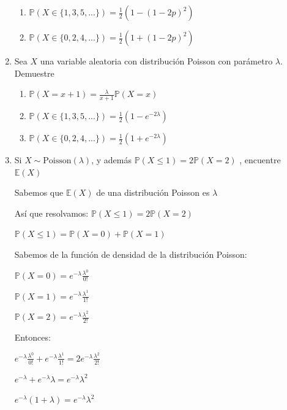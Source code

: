 \documentclass[11pt,a4paper]{report}
\begin{document}
\begin{enumerate}
{\begin{enumerate}
				\item {
					$\mathbb{P}(X \in \{ 1,3,5,...\}) = \frac{1}{2}
					 (1 - (1 - 2p)^2)$
				}

				\item {
					$\mathbb{P}(X \in \{ 0,2,4,...\}) = \frac{1}{2}
					 (1 + (1 - 2p)^2)$
				}
			\end{enumerate}
		}

		\item{
		Sea $X$ una variable aleatoria con distribución Poisson con parámetro
		$\lambda$. Demuestre
			\begin{enumerate}
				\item {
					$\mathbb{P}(X = x + 1) = \frac{\lambda}{x + 1}
					 \mathbb{P}(X = x)$
				}

				\item {
					$\mathbb{P}(X \in \{ 1,3,5,...\}) = \frac{1}{2}
					 (1 - e^{-2\lambda})$
				}

				\item {
					$\mathbb{P}(X \in \{ 0,2,4,...\}) = \frac{1}{2}
					 (1 + e^{-2\lambda})$
				}
			\end{enumerate}
		}

		\item{
			Si $X \sim \text{Poisson}(\lambda)$, y además $\mathbb{P}(X \leq 1)
			= 2\mathbb{P}(X = 2)$ , encuentre $\mathbb{E}(X)$
			
			Sabemos que $\mathbb{E}(X)$ de una distribución Poisson es $\lambda$
			
			Así que resolvamos: $\mathbb{P}(X \leq 1) = 2\mathbb{P}(X = 2)$
			
			$\mathbb{P}(X \leq 1) = \mathbb{P}(X = 0) + \mathbb{P}(X = 1)$
			
			Sabemos de la función de densidad de la distribución Poisson:
			
			$\mathbb{P}(X = 0) = e^{-\lambda} \frac{\lambda^{0}}{0!}$
			
			$\mathbb{P}(X = 1) = e^{-\lambda} \frac{\lambda^{1}}{1!}$

			$\mathbb{P}(X = 2) = e^{-\lambda} \frac{\lambda^{2}}{2!}$
			
			Entonces:
			
			$e^{-\lambda} \frac{\lambda^{0}}{0!} + e^{-\lambda} \frac{\lambda^{1}}{1!} = 2 e^{-\lambda} \frac{\lambda^{2}}{2!}$
			
			$e^{-\lambda}  + e^{-\lambda} \lambda =  e^{-\lambda} \lambda^{2}$
			
			$e^{-\lambda} (1 + \lambda) =  e^{-\lambda} \lambda^{2}$
			
}
\end{enumerate}
\end{document}
